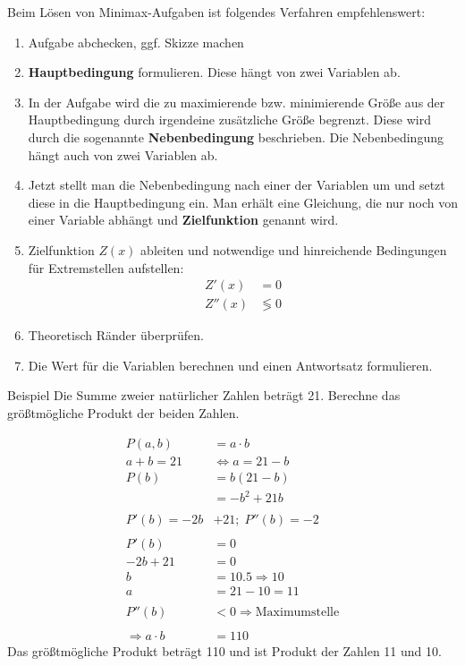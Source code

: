 \documentclass{article}
\begin{document}
Beim Lösen von Minimax-Aufgaben ist folgendes Verfahren empfehlenswert:
\begin{enumerate}
    \item Aufgabe abchecken, ggf. Skizze machen
    \item \textbf{Hauptbedingung} formulieren. Diese hängt von zwei Variablen ab.
    \item In der Aufgabe wird die zu maximierende bzw. minimierende Größe 
    aus der Hauptbedingung durch irgendeine zusätzliche Größe begrenzt.
    Diese wird durch die sogenannte \textbf{Nebenbedingung} beschrieben.
    Die Nebenbedingung hängt auch von zwei Variablen ab.
    \item Jetzt stellt man die Nebenbedingung nach einer der Variablen um
    und setzt diese in die Hauptbedingung ein.
    Man erhält eine Gleichung, die nur noch von einer Variable abhängt und
    \textbf{Zielfunktion} genannt wird.
    \item Zielfunktion $Z(x)$ ableiten und notwendige und hinreichende Bedingungen
    für Extremstellen aufstellen:
    \begin{align*}
        Z'(x) &= 0 \\
        Z''(x) &\lessgtr 0
    \end{align*}
    \item Theoretisch Ränder überprüfen.
    \item Die Wert für die Variablen berechnen und einen Antwortsatz formulieren.
\end{enumerate}

\begin{boxx}[DarkBlue]{Beispiel}
    Die Summe zweier natürlicher Zahlen beträgt 21.
    Berechne das größtmögliche Produkt der beiden Zahlen.

    \begin{align*}
        P(a,b) &= a\cdot b \\
        a + b = 21 &\Leftrightarrow a = 21 - b \\
        P(b) &= b(21-b) \\
        &= -b^2 + 21b \\\\
        P'(b) = -2b &+ 21;\;P''(b) = -2 \\\\
        P'(b) &= 0 \\
        -2b + 21 &= 0 \\
        b &= 10.5 \Rightarrow 10 \\
        a &= 21-10 = 11\\\\
        P''(b) &< 0 \Rightarrow \text{Maximumstelle}\\\\
        \Rightarrow a\cdot b &= 110
    \end{align*}
    Das größtmögliche Produkt beträgt 110 und ist Produkt der Zahlen 11 und 10.
\end{boxx}
\end{document}
